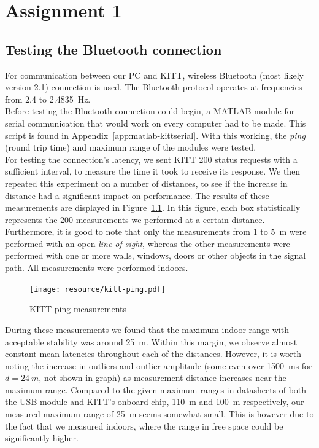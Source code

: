 \documentclass[11pt,titlepage]{report}
\begin{document}
\chapter{Assignment 1}
\section{Testing the Bluetooth connection}
For communication between our PC and KITT, wireless Bluetooth (most likely version 2.1) connection is used. The Bluetooth protocol operates at frequencies from \num{2.4} to \SI{2.4835}{Hz}. \cite{bluetooth-specs}
\\
Before testing the Bluetooth connection could begin, a MATLAB module for serial communication that would work on every computer had to be made. This script is found in Appendix~\ref{app:matlab-kittserial}. With this working, the \textit{ping} (round trip time) and maximum range of the modules were tested.
\\
For testing the connection's latency, we sent KITT \num{200} status requests with a sufficient interval, to measure the time it took to receive its response. We then repeated this experiment on a number of distances, to see if the increase in distance had a significant impact on performance. The results of these measurements are displayed in Figure~\ref{fig:ass1-ping}. In this figure, each box statistically represents the \num{200} measurements we performed at a certain distance. Furthermore, it is good to note that only the measurements from \num{1} to \SI{5}{m} were performed with an open \textit{line-of-sight}, whereas the other measurements were performed with one or more walls, windows, doors or other objects in the signal path. All measurements were performed indoors.

\begin{figure}[H]
	\centering
	\texttt{[image: resource/kitt-ping.pdf]}
	\caption{KITT ping measurements}
	\label{fig:ass1-ping}
\end{figure}

During these measurements we found that the maximum indoor range with acceptable stability was around \SI{25}{m}. Within this margin, we observe almost constant mean latencies throughout each of the distances. However, it is worth noting the increase in outliers and outlier amplitude (some even over \SI{1500}{ms} for $d = \SI{24}{m}$, not shown in graph) as measurement distance increases near the maximum range. Compared to the given maximum ranges in datasheets of both the USB-module and KITT's onboard chip, \SI{110}{m} and \SI{100}{m} respectively, our measured maximum range of \SI{25}{m} seems somewhat small. This is however due to the fact that we measured indoors, where the range in free space could be significantly higher. \cite{lm506-datasheet,rn41-datasheet}
\end{document}
